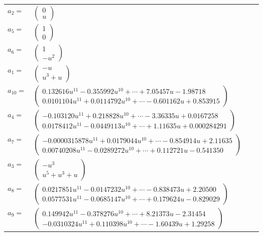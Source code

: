 \documentclass[1p]{elsarticle_modified}
\theoremstyle{definition}
\begin{document}
\begin{tabular}{m{7pt} m{180pt} m{7pt} m{180pt} }
\flushright $a_{2}=$&$\begin{pmatrix}0\\u\end{pmatrix}$ \\
\flushright $a_{5}=$&$\begin{pmatrix}1\\0\end{pmatrix}$ \\
\flushright $a_{6}=$&$\begin{pmatrix}1\\- u^2\end{pmatrix}$ \\
\flushright $a_{1}=$&$\begin{pmatrix}- u\\u^3+u\end{pmatrix}$ \\
\flushright $a_{10}=$&$\begin{pmatrix}0.132616 u^{11}-0.355992 u^{10}+\cdots+7.05457 u-1.98718\\0.0101104 u^{11}+0.0114792 u^{10}+\cdots-0.601162 u+0.853915\end{pmatrix}$ \\
\flushright $a_{4}=$&$\begin{pmatrix}-0.103120 u^{11}+0.218828 u^{10}+\cdots-3.36335 u+0.0167258\\0.0178412 u^{11}-0.0449113 u^{10}+\cdots+1.11635 u+0.000284291\end{pmatrix}$ \\
\flushright $a_{7}=$&$\begin{pmatrix}-0.0000315878 u^{11}+0.0179044 u^{10}+\cdots-0.854914 u+2.11635\\0.00740208 u^{11}-0.0289272 u^{10}+\cdots+0.112721 u-0.541350\end{pmatrix}$ \\
\flushright $a_{3}=$&$\begin{pmatrix}- u^3\\u^5+u^3+u\end{pmatrix}$ \\
\flushright $a_{8}=$&$\begin{pmatrix}0.0217851 u^{11}-0.0147232 u^{10}+\cdots-0.838473 u+2.20500\\0.0577531 u^{11}-0.0685147 u^{10}+\cdots+0.179624 u-0.829029\end{pmatrix}$ \\
\flushright $a_{9}=$&$\begin{pmatrix}0.149942 u^{11}-0.378276 u^{10}+\cdots+8.21373 u-2.31454\\-0.0310324 u^{11}+0.110398 u^{10}+\cdots-1.60439 u+1.29258\end{pmatrix}$ \\

\end{tabular}
\end{document}
